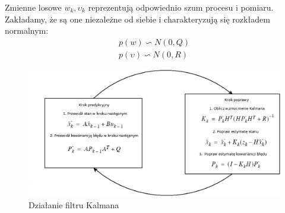 Zmienne losowe $w_k, \upsilon_k$ reprezentują odpowiednio szum procesu i pomiaru. Zakładamy, że są one niezależne od siebie i charakteryzują się rozkładem normalnym:
\begin{equation}
\begin{split}
 p(w) \backsim N(0,Q) \\
 p(\upsilon) \backsim N(0,R)
 \end{split}
\end{equation}

\begin{figure}
\centering
	\includegraphics[width=\textwidth]{ECG_BASELINE/figures/KF.png}
\caption{Działanie filtru Kalmana}
\label{Kalman}
\end{figure}

